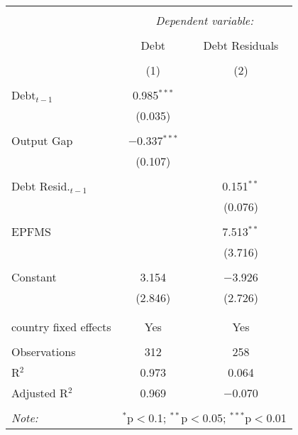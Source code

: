 
\begingroup 
\tiny 
\begin{tabular}{@{\extracolsep{5pt}}lcc} 
\\[-1.8ex]\hline 
\hline \\[-1.8ex] 
 & \multicolumn{2}{c}{\textit{Dependent variable:}} \\ 
\cline{2-3} 
\\[-1.8ex] & Debt & Debt Residuals \\ 
\\[-1.8ex] & (1) & (2)\\ 
\hline \\[-1.8ex] 
 Debt$_{t-1}$ & 0.985$^{***}$ &  \\ 
  & (0.035) &  \\ 
  & & \\ 
 Output Gap & $-$0.337$^{***}$ &  \\ 
  & (0.107) &  \\ 
  & & \\ 
 Debt Resid.$_{t-1}$ &  & 0.151$^{**}$ \\ 
  &  & (0.076) \\ 
  & & \\ 
 EPFMS &  & 7.513$^{**}$ \\ 
  &  & (3.716) \\ 
  & & \\ 
 Constant & 3.154 & $-$3.926 \\ 
  & (2.846) & (2.726) \\ 
  & & \\ 
\hline \\[-1.8ex] 
country fixed effects & Yes & Yes \\ 
\hline \\[-1.8ex] 
Observations & 312 & 258 \\ 
R$^{2}$ & 0.973 & 0.064 \\ 
Adjusted R$^{2}$ & 0.969 & $-$0.070 \\ 
\hline 
\hline \\[-1.8ex] 
\textit{Note:}  & \multicolumn{2}{r}{$^{*}$p$<$0.1; $^{**}$p$<$0.05; $^{***}$p$<$0.01} \\ 
\end{tabular} 
\endgroup 
